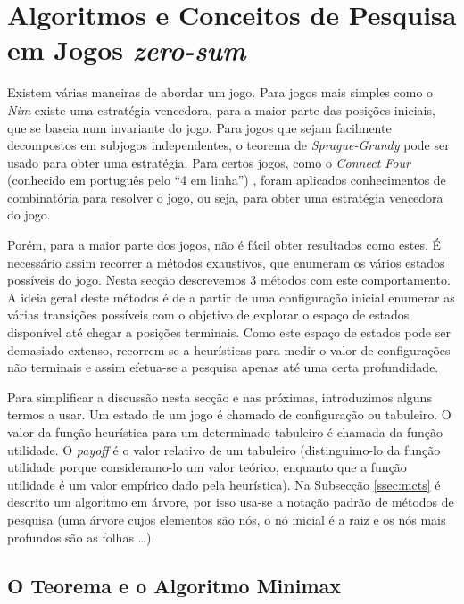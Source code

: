 \documentclass[12pt,a4paper,oneside]{article}
\begin{document}

\section{Algoritmos e Conceitos de Pesquisa em Jogos \textit{zero-sum}}
\label{sec:algconc}

Existem várias maneiras de abordar um jogo. Para jogos mais simples
como o \textit{Nim} existe uma estratégia vencedora, para a maior
parte das posições iniciais, que se baseia num invariante do
jogo. Para jogos que sejam facilmente decompostos em subjogos
independentes, o teorema de \textit{Sprague-Grundy} pode ser usado
para obter uma estratégia. Para certos jogos, como o \textit{Connect
  Four} (conhecido em português pelo ``4 em linha'')
\cite{Allis:1988}, foram aplicados conhecimentos de combinatória para
resolver o jogo, ou seja, para obter uma estratégia vencedora do
jogo.

Porém, para a maior parte dos jogos, não é fácil obter resultados como
estes. É necessário assim recorrer a métodos exaustivos, que enumeram
os vários estados possíveis do jogo. Nesta secção descrevemos 3
métodos com este comportamento. A ideia geral deste métodos é de a
partir de uma configuração inicial enumerar as várias transições
possíveis com o objetivo de explorar o espaço de estados disponível
até chegar a posições terminais. Como este espaço de estados pode ser
demasiado extenso, recorrem-se a heurísticas para medir o valor de
configurações não terminais e assim efetua-se a pesquisa apenas até
uma certa profundidade.

Para simplificar a discussão nesta secção e nas próximas, introduzimos
alguns termos a usar. Um estado de um jogo é chamado de configuração
ou tabuleiro. O valor da função heurística para um determinado
tabuleiro é chamada da função utilidade. O \textit{payoff} é o valor
relativo de um tabuleiro (distinguimo-lo da função utilidade porque
consideramo-lo um valor teórico, enquanto que a função utilidade é um
valor empírico dado pela heurística). Na Subsecção \ref{ssec:mcts} é
descrito um algoritmo em árvore, por isso usa-se a notação padrão de
métodos de pesquisa (uma árvore cujos elementos são nós, o nó inicial
é a raiz e os nós mais profundos são as folhas \ldots).

\subsection{O Teorema e o Algoritmo Minimax}
\end{document}
